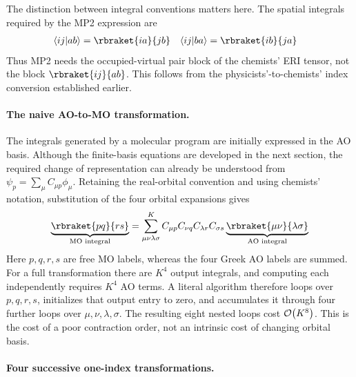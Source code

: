 \documentclass[11pt,a4paper,titlepage]{article}
\numberwithin{equation}{section}
\begin{document}
The distinction between integral conventions matters here. The spatial
integrals required by the MP2 expression are
\begin{align}
  \braket{ij}{ab}&=\rbraket{ia}{jb}
  &
  \braket{ij}{ba}&=\rbraket{ib}{ja}
\end{align}
Thus MP2 needs the occupied-virtual pair block of the chemists' ERI tensor,
not the block $\rbraket{ij}{ab}$. This follows from the physicists'-to-chemists'
index conversion established earlier.

\paragraph{The naive AO-to-MO transformation.}

The integrals generated by a molecular program are initially expressed in
the AO basis. Although the finite-basis equations are developed in the next
section, the required change of representation can already be understood
from $\psi_p=\sum_\mu C_{\mu p}\phi_\mu$. Retaining the real-orbital
convention and using chemists' notation, substitution of the four orbital
expansions gives
\begin{equation}
  \underbrace{\rbraket{pq}{rs}}_{\text{MO integral}}
  =\sum_{\mu\nu\lambda\sigma}^{K}
    C_{\mu p}C_{\nu q}C_{\lambda r}C_{\sigma s}
    \underbrace{\rbraket{\mu\nu}{\lambda\sigma}}_{\text{AO integral}}
  \label{eq:ao-mo-four-index}
\end{equation}
Here $p,q,r,s$ are free MO labels, whereas the four Greek AO labels are
summed. For a full transformation there are $K^4$ output integrals, and
computing each independently requires $K^4$ AO terms. A literal algorithm
therefore loops over $p,q,r,s$, initializes that output entry to zero, and
accumulates it through four further loops over $\mu,\nu,\lambda,\sigma$.
The resulting eight nested loops cost $\order{K^8}$. This is the cost of
a poor contraction order, not an intrinsic cost of changing orbital basis.

\paragraph{Four successive one-index transformations.}
\end{document}
